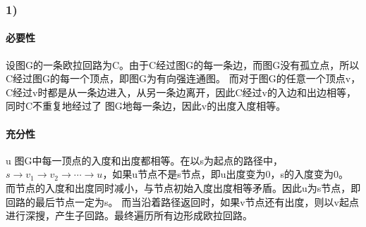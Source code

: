 \documentclass[11pt,a4paper,oneside,oldfontcommands]{ctexart}
\begin{document}
\subsubsection*{1)}
\paragraph*{必要性}
设图G的一条欧拉回路为C。由于C经过图G的每一条边，而图G没有孤立点，所以C经过图G的每一个顶点，即图G为有向强连通图。
而对于图G的任意一个顶点v，C经过v时都是从一条边进入，从另一条边离开，因此C经过v的入边和出边相等，同时C不重复地经过了
图G地每一条边，因此v的出度入度相等。
\paragraph*{充分性}u
图G中每一顶点的入度和出度都相等。在以s为起点的路径中，$s\rightarrow v_1\rightarrow v_2
\rightarrow\cdots\rightarrow u$，如果u节点不是s节点，即u出度变为0，s的入度变为0。
而节点的入度和出度同时减小，与节点初始入度出度相等矛盾。因此u为s节点，即回路的最后节点一定为s。
而当沿着路径返回时，如果v节点还有出度，则以v起点进行深搜，产生子回路。最终遍历所有边形成欧拉回路。
\end{document}
